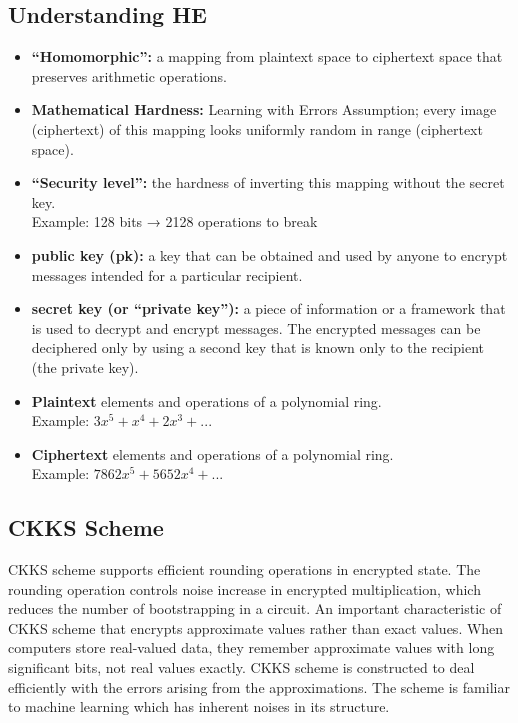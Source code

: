 \documentclass[11pt]{article}
\begin{document}
\subsection{Understanding HE}
\begin{itemize}
\item \textbf{“Homomorphic”:} a mapping from plaintext space to ciphertext space that preserves arithmetic operations.
\item \textbf{Mathematical Hardness:} Learning with Errors Assumption; every image (ciphertext) of this mapping looks uniformly random in range (ciphertext space).
\item \textbf{“Security level”:} the hardness of inverting this mapping without the secret key.\\
Example: 128 bits → 2128 operations to break 
\item \textbf{public key (pk):} a key that can be obtained and used by anyone to encrypt messages intended for a particular recipient.\\
\item \textbf{secret key (or “private key”):} a piece of information or a framework that is used to decrypt and encrypt messages. The encrypted messages can be deciphered only by using a second key that is known only to the recipient (the private key).\\
\item \textbf{Plaintext} elements and operations of a polynomial ring. \\
Example: \(3x^5 + x^4 + 2x^3 + ...\)
\item \textbf{Ciphertext} elements and operations of a polynomial ring.\\
Example: \(7862x^5 + 5652x^4 + ...\)
\end{itemize}
\subsection{CKKS Scheme}

CKKS scheme supports efficient rounding operations in encrypted state. The rounding operation controls noise increase in encrypted multiplication, which reduces the number of bootstrapping in a circuit. An important characteristic of CKKS scheme that encrypts approximate values rather than exact values. When computers store real-valued data, they remember approximate values with long significant bits, not real values exactly. CKKS scheme is constructed to deal efficiently with the errors arising from the approximations. The scheme is familiar to machine learning which has inherent noises in its structure.
\end{document}
